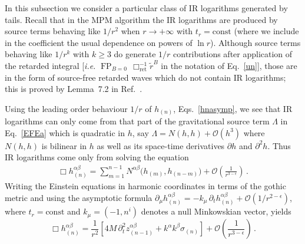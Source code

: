 \documentclass[prd,preprint,superscriptaddress,tightenlines,nofootinbib,
  eqsecnum,showpacs]{revtex4}
\begin{document}
In this subsection we consider a particular class of IR
logarithms generated by tails. Recall that in the MPM algorithm the IR
logarithms are produced by source terms behaving like $1/r^2$ when
$r\to +\infty$ with $t_r=\text{const}$ (where we include in the
coefficient the usual dependence on powers of $\ln r$). Although
source terms behaving like $1/r^k$ with $k\geqslant 3$ do generate
$1/r$ contributions after application of the retarded integral
[\textit{i.e.}  $\mathop{\mathrm{FP}}_{B=0} \, \Box^{-1}_\mathrm{ret}
  \widetilde{r}^B$ in the notation of Eq.~\eqref{un}], those are in
the form of source-free retarded waves which do not contain IR
logarithms; this is proved by Lemma~7.2 in Ref.~\cite{BD86}.

Using the leading order behaviour $1/r$ of $h_{(n)}$,
Eqs.~\eqref{hnasymp}, we see that IR logarithms can only come from
that part of the gravitational source term $\Lambda$ in
Eq.~\eqref{EFEa} which is quadratic in $h$, say $\Lambda = N(h,h) +
\mathcal{O}(h^3)$ where $N(h,h)$ is bilinear in $h$ as well as its
space-time derivatives $\partial h$ and $\partial^2 h$. Thus IR
logarithms come only from solving the equation
%
\begin{align} \label{BoxhN}
\Box h^{\alpha\beta}_{(n)} = \sum_{m=1}^{n-1}
N^{\alpha\beta}\bigl(h_{(m)},h_{(n-m)}\bigr) +
\mathcal{O}\left(\frac{1}{r^{3 - \epsilon}}\right)\,.
\end{align}
%
Writing the Einstein equations in harmonic coordinates in terms of the
gothic metric and using the asymptotic formula $\partial_\mu
h^{\alpha\beta}_{(n)} = - k_\mu \,\partial_t h^{\alpha\beta}_{(n)} +
\mathcal{O}(1/r^{2-\epsilon})$, where $t_r=\text{const}$ and $k_\mu=
(-1, n^i)$ denotes a null Minkowskian vector, yields \cite{B87, BD92}
%
\begin{equation} \label{eqnIR}
\Box h^{\alpha\beta}_{(n)} = \frac{1}{r^2}\left[ 4M \,\partial_t^2
  z^{\alpha\beta}_{(n-1)} + k^\alpha k^\beta \sigma_{(n)} \right] +
\mathcal{O}\left(\frac{1}{r^{3 - \epsilon}}\right)\,.
\end{equation}
%
\end{document}
